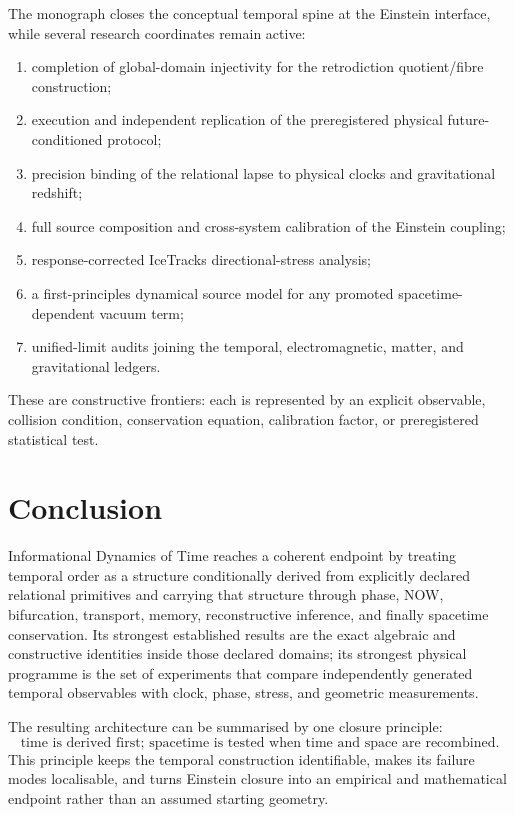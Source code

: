 The monograph closes the conceptual temporal spine at the Einstein interface, while several research coordinates remain active:
\begin{enumerate}
\item completion of global-domain injectivity for the retrodiction quotient/fibre construction;
\item execution and independent replication of the preregistered physical future-conditioned protocol;
\item precision binding of the relational lapse to physical clocks and gravitational redshift;
\item full source composition and cross-system calibration of the Einstein coupling;
\item response-corrected IceTracks directional-stress analysis;
\item a first-principles dynamical source model for any promoted spacetime-dependent vacuum term;
\item unified-limit audits joining the temporal, electromagnetic, matter, and gravitational ledgers.
\end{enumerate}

These are constructive frontiers: each is represented by an explicit observable, collision condition, conservation equation, calibration factor, or preregistered statistical test.

\section{Conclusion}

Informational Dynamics of Time reaches a coherent endpoint by treating temporal order as a structure conditionally derived from explicitly declared relational primitives and carrying that structure through phase, NOW, bifurcation, transport, memory, reconstructive inference, and finally spacetime conservation. Its strongest established results are the exact algebraic and constructive identities inside those declared domains; its strongest physical programme is the set of experiments that compare independently generated temporal observables with clock, phase, stress, and geometric measurements.

The resulting architecture can be summarised by one closure principle:
\[
\boxed{
\text{time is derived first; spacetime is tested when time and space are recombined.}
}
\]
This principle keeps the temporal construction identifiable, makes its failure modes localisable, and turns Einstein closure into an empirical and mathematical endpoint rather than an assumed starting geometry.

